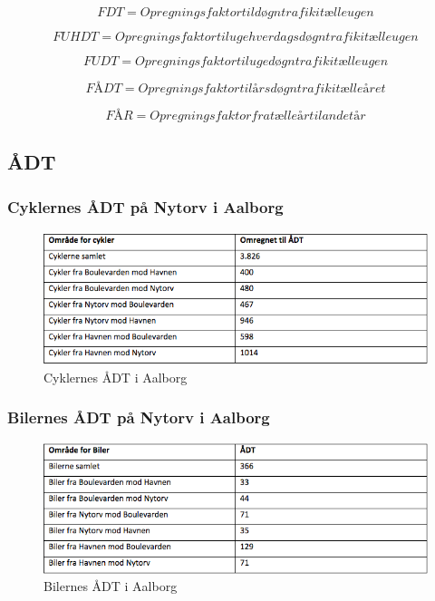 $$FDT = Opregningsfaktor til døgntrafik i tælleugen$$

$$FUHDT = Opregningsfaktor til ugehverdagsdøgntrafik i tælleugen$$

$$FUDT = Opregningsfaktor til ugedøgntrafik i tælleugen$$

$$FÅDT = Opregningsfaktor til årsdøgntrafik i tælleåret$$

$$FÅR = Opregningsfaktor fra tælleår til andet år$$


\subsection{ÅDT}
\label{AEDT}
\subsubsection{Cyklernes ÅDT på Nytorv i Aalborg}
\begin{figure}[htbp]
   \centering
   \begin{adjustbox}{max width=\textwidth}
     \includegraphics[scale=0.8]{figures/Billederogfigur/cykleradt.jpg}
  \end{adjustbox}
   \caption{Cyklernes ÅDT i Aalborg}
   \label{fig:cykleradt}
 \end{figure}

 \subsubsection{Bilernes ÅDT på Nytorv i Aalborg}
 \begin{figure}[htbp]
   \centering
   \begin{adjustbox}{max width=\textwidth}
     \includegraphics[scale=0.6]{figures/Billederogfigur/bileradt.jpg}
  \end{adjustbox}
   \caption{Bilernes ÅDT i Aalborg}
   \label{fig:bileradt}
 \end{figure}

